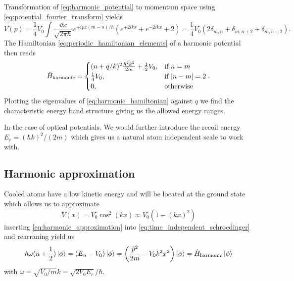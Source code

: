 Transformation of \cref{eq:harmonic_potential} to momentum space
using \cref{eq:potential_fourier_transform} yields
\begin{equation*}
  V(p)
  =
  \frac{1}{4}V_0
  \int\frac{\dd{x}}{\sqrt{2\pi\hbar}}
  e^{+ipx(m-n)/\hbar}\left(e^{+2ikx}+e^{-2ikx}+2\right)
  =
  \frac{1}{4}V_0\left(2\delta_{m,n}+\delta_{m,n+2}+\delta_{m,n-2}\right).
\end{equation*}
The Hamiltonian \cref{eq:periodic_hamiltonian_elements} of a
harmonic potential then reads
\begin{equation}
  \hat{H}_\text{harmonic}
  =\begin{cases}
    (n+q/k)^2\frac{\hbar^2k^2}{2m}+\frac{1}{2}V_0, & \text{if } n=m\\
    \frac{1}{4}V_0, & \text{if } \abs{n-m}=2\\
    0, & \text{otherwise}
  \end{cases}
  \label{eq:harmonic_hamiltonian}.
\end{equation}
Plotting the eigenvalues of \cref{eq:harmonic_hamiltonian} against
$q$ we find the characteristic energy band structure giving us the allowed
energy ranges.

In the case of optical potentials. We would further introduce the recoil
energy $E_r=(\hbar k)^2/(2m)$ which gives us a natural atom independent scale
to work with.

\subsection{Harmonic approximation}

Cooled atoms have a low kinetic energy and will be located at the ground
state which allows us to approximate
\begin{equation}
  V(x)
  =V_0\cos^2(kx)
  \approx V_0\left(1-(kx)^2\right)
  \label{eq:harmonic_approximation}
\end{equation}
inserting \cref{eq:harmonic_approximation} into
\cref{eq:time_independent_schroedinger} and rearraning yield us
\begin{equation}
  \hbar\omega(n+\frac{1}{2})\ket{\phi}
  =(E_n-V_0)\ket{\phi}
  =\left(\frac{\hat{p}^2}{2m}-V_0k^2x^2\right)\ket{\phi}
  =\hat{H}_\text{harmonic}\ket{\phi}
\end{equation}
with $\omega=\sqrt{V_0/m}k=\sqrt{2V_0E_r}/\hbar$.
